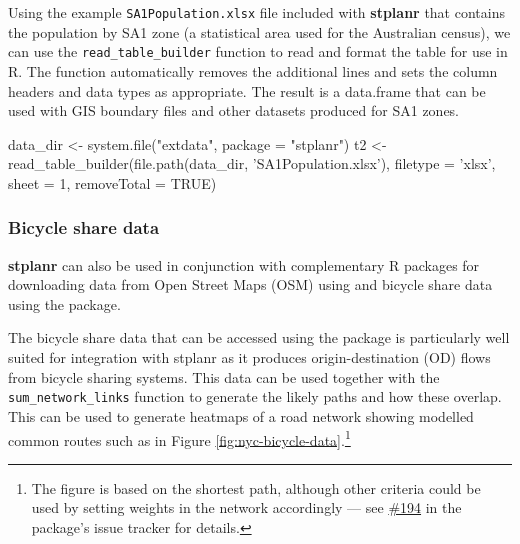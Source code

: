 Using the example \texttt{SA1Population.xlsx} file included with \textbf{stplanr} that contains the population by SA1 zone (a statistical area used for the Australian census), we can use the \texttt{read\_table\_builder} function to read and format the table for use in R.
The function automatically removes the additional lines and sets the column headers and data types as appropriate.
The result is a data.frame that can be used with GIS boundary files and other datasets produced for SA1 zones.

\begin{Schunk}
\begin{Sinput}
data_dir <- system.file("extdata", package = "stplanr")
t2 <- read_table_builder(file.path(data_dir, 'SA1Population.xlsx'),
                         filetype = 'xlsx', sheet = 1, removeTotal = TRUE)
\end{Sinput}
\end{Schunk}

\subsubsection{Bicycle share data} \label{bicycle-share-data}
\textbf{stplanr} can also be used in conjunction with complementary R packages for downloading data from Open Street Maps (OSM) using  and bicycle share data using the  package.

The bicycle share data that can be accessed using the  package is particularly well suited for integration with stplanr as it produces origin-destination (OD) flows from bicycle sharing systems.
This data can be used together with the \texttt{sum\_network\_links} function to generate the likely paths and how these overlap.
This can be used to generate heatmaps of a road network showing modelled common routes such as in Figure
\ref{fig:nyc-bicycle-data}.\footnote{The
figure is based on the shortest path, although other criteria could be used by setting weights in the network accordingly --- see \href{https://github.com/ropensci/stplanr/issues/194}{\#194} in the package's issue tracker for
details.}

